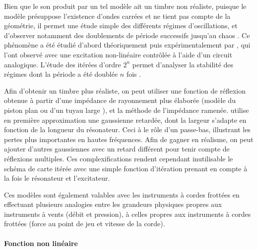 Bien que le son produit par un tel modèle ait un timbre non réaliste, puisque le modèle présuppose l'existence d'ondes carrées et ne tient pas compte de la géométrie, il permet une étude simple des différents régimes d'oscillations, et d'observer notamment des doublements de période successifs jusqu'au chaos
\cite{bergeotNaissanceOscillationsDans}. Ce phénomène a été étudié d'abord théoriquement puis expérimentalement par \cite{maganza_bifurcations_1986}, qui l'ont observé avec une excitation non-linéaire contrôlée à l'aide d'un circuit analogique. L'étude des itérées d'ordre $2^n$ permet d'analyser la stabilité des régimes dont la période a été doublée $n$ fois \cite{taillardIteratedMapsClarinetlike2010}.

Afin d'obtenir un timbre plus réaliste, on peut utiliser une fonction de réflexion obtenue à partir d'une impédance de rayonnement plus élaborée (modèle du piston plan ou d'un tuyau large \cite{chaigne2008acoustique}), et la méthode de l'impédance ramenée. \cite{mcintyre_oscillations_1983} utilise en première approximation une gaussienne retardée, dont la largeur s'adapte en fonction de la longueur du résonateur. Ceci à le rôle d'un passe-bas, illustrant les pertes plus importantes en hautes fréquences. Afin de gagner en réalisme, on peut ajouter d'autres gaussiennes avec un retard différent pour tenir compte de réflexions multiples.
Ces complexifications rendent cependant inutilisable le schéma de carte itérée avec une simple fonction d'itération prenant en compte à la fois le résonateur et l'excitateur.







Ces modèles sont également valables avec les instruments à cordes frottées \cite{ollivier_idealized_2004} en effectuant plusieurs analogies entre les grandeurs physiques propres aux instruments à vents (débit et pression), à celles propres aux instruments à cordes frottées (force au point de jeu et vitesse de la corde).

\paragraph{Fonction non linéaire}

